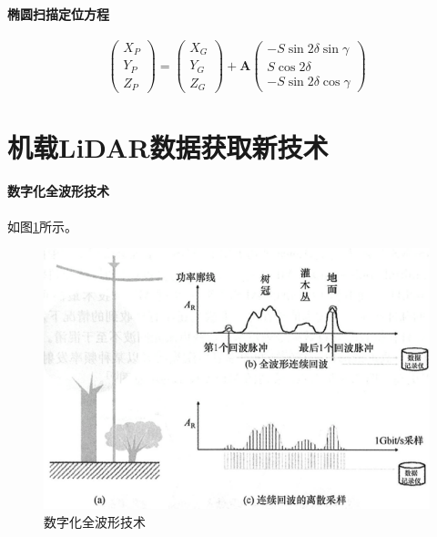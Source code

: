 \paragraph{椭圆扫描定位方程}
\begin{equation}
\begin{pmatrix}
X_P \\ Y_P \\ Z_P
\end{pmatrix} = \begin{pmatrix}
X_G \\ Y_G \\ Z_G
\end{pmatrix} + \symbf{A} \begin{pmatrix}
-S\sin 2\delta \sin \gamma \\ 
S \cos 2\delta \\ 
-S \sin 2\delta \cos \gamma
\end{pmatrix}
\end{equation}

\section{机载LiDAR数据获取新技术} %
\paragraph{数字化全波形技术}如图\ref{fig:数字化全波形技术}所示。
\begin{figure}[htbp]
	\centering
	\includegraphics[width=0.7\linewidth]{figure/Chapter3/数字化全波形技术}
	\caption{数字化全波形技术}
	\label{fig:数字化全波形技术}
\end{figure}

